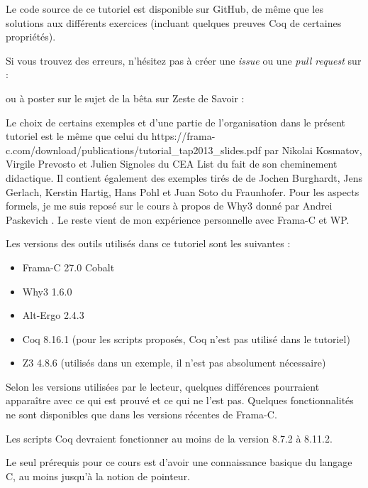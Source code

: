 \begin{Warning}
  Le code source de ce
  tutoriel est disponible sur GitHub, de même que les solutions aux
  différents exercices (incluant quelques preuves Coq de certaines
  propriétés).

  Si vous trouvez des erreurs, n'hésitez pas à créer une \textit{issue} ou
  une \textit{pull request} sur :


  ou à poster sur le sujet de la bêta sur Zeste de Savoir :

\end{Warning}

\begin{Information}
Le choix de certains exemples et d'une partie de l'organisation dans le présent
tutoriel est le même que celui du
             {https://frama-c.com/download/publications/tutorial_tap2013_slides.pdf}
par Nikolai Kosmatov, Virgile Prevosto et Julien Signoles du CEA List du fait de
son cheminement didactique. Il contient également des exemples tirés de
\textit{}
de Jochen Burghardt, Jens Gerlach, Kerstin Hartig, Hans Pohl et Juan Soto du
Fraunhofer. Pour les aspects formels, je me suis reposé sur le cours
à propos de Why3 donné par Andrei Paskevich
\textit{}.
Le reste vient de mon expérience personnelle avec Frama-C et WP.

\horizontalLine

Les versions des outils utilisés dans ce tutoriel sont les suivantes :
\begin{itemize}
\item Frama-C 27.0 Cobalt
\item Why3 1.6.0
\item Alt-Ergo 2.4.3
\item Coq 8.16.1 (pour les scripts proposés, Coq n'est pas utilisé dans le tutoriel)
\item Z3 4.8.6 (utilisés dans un exemple, il n'est pas absolument nécessaire)
\end{itemize}
Selon les versions utilisées par le lecteur, quelques différences pourraient
apparaître avec ce qui est prouvé et ce qui ne l'est pas. Quelques fonctionnalités
ne sont disponibles que dans les versions récentes de Frama-C.

Les scripts Coq devraient fonctionner au moins de la version 8.7.2 à 8.11.2.

\horizontalLine

Le seul prérequis pour ce cours est d'avoir une connaissance basique du
langage C, au moins jusqu'à la notion de pointeur.


\end{Information}

